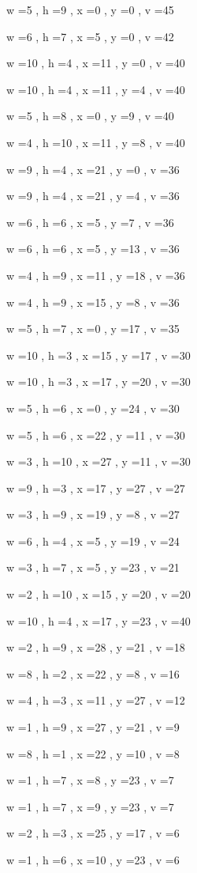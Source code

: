 \documentclass[11pt]{article}
\begin{document}
w =5 , h =9 , x =0 , y =0 , v =45
\par
w =6 , h =7 , x =5 , y =0 , v =42
\par
w =10 , h =4 , x =11 , y =0 , v =40
\par
w =10 , h =4 , x =11 , y =4 , v =40
\par
w =5 , h =8 , x =0 , y =9 , v =40
\par
w =4 , h =10 , x =11 , y =8 , v =40
\par
w =9 , h =4 , x =21 , y =0 , v =36
\par
w =9 , h =4 , x =21 , y =4 , v =36
\par
w =6 , h =6 , x =5 , y =7 , v =36
\par
w =6 , h =6 , x =5 , y =13 , v =36
\par
w =4 , h =9 , x =11 , y =18 , v =36
\par
w =4 , h =9 , x =15 , y =8 , v =36
\par
w =5 , h =7 , x =0 , y =17 , v =35
\par
w =10 , h =3 , x =15 , y =17 , v =30
\par
w =10 , h =3 , x =17 , y =20 , v =30
\par
w =5 , h =6 , x =0 , y =24 , v =30
\par
w =5 , h =6 , x =22 , y =11 , v =30
\par
w =3 , h =10 , x =27 , y =11 , v =30
\par
w =9 , h =3 , x =17 , y =27 , v =27
\par
w =3 , h =9 , x =19 , y =8 , v =27
\par
w =6 , h =4 , x =5 , y =19 , v =24
\par
w =3 , h =7 , x =5 , y =23 , v =21
\par
w =2 , h =10 , x =15 , y =20 , v =20
\par
w =10 , h =4 , x =17 , y =23 , v =40
\par
w =2 , h =9 , x =28 , y =21 , v =18
\par
w =8 , h =2 , x =22 , y =8 , v =16
\par
w =4 , h =3 , x =11 , y =27 , v =12
\par
w =1 , h =9 , x =27 , y =21 , v =9
\par
w =8 , h =1 , x =22 , y =10 , v =8
\par
w =1 , h =7 , x =8 , y =23 , v =7
\par
w =1 , h =7 , x =9 , y =23 , v =7
\par
w =2 , h =3 , x =25 , y =17 , v =6
\par
w =1 , h =6 , x =10 , y =23 , v =6
\par
\newpage
\end{document}

